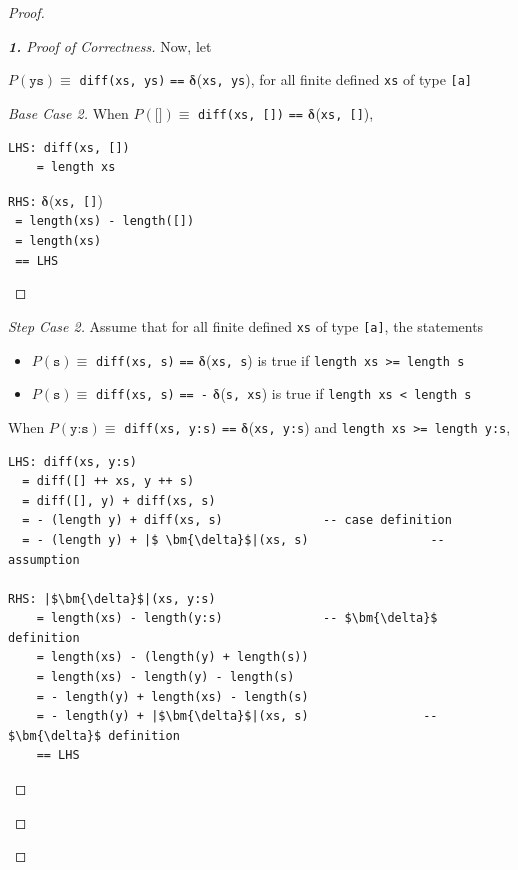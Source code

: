 \documentclass[12pt]{article}
\newcommand{\haskell}{\texttt}
\begin{document}
\begin{proof}
\begin{proof}[\textbf{1.} Proof of Correctness]
\bigskip\bigskip\par\noindent Now, let
\begin{center}
    $P(\haskell{ys}) \equiv$ \haskell{diff(xs, ys)} \haskell{==} $\bm{\delta}$(\haskell{xs, ys}), for all finite defined \haskell{xs} of type \haskell{[a]}
\end{center}

\begin{proof}[Base Case 2]
When $P(\haskell{[]}) \equiv$ \haskell{diff(xs, [])} \haskell{==} $\bm{\delta}$(\haskell{xs, []}),
\begin{mdframed}
\begin{multicols}{2}
\begin{verbatim}
LHS: diff(xs, [])
    = length xs
\end{verbatim}
\columnbreak
\haskell{RHS:} $ \bm{\delta}$(\haskell{xs, []}) \\
\haskell{    = length(xs) - length([])} \\
\haskell{    = length(xs)} \\
\haskell{    == LHS}
\end{multicols}
\end{mdframed}
\end{proof}

\begin{proof}[Step Case 2]
Assume that for all finite defined \haskell{xs} of type \haskell{[a]}, the statements
\begin{itemize}
    \item $P(\haskell{s}) \equiv$ \haskell{diff(xs, s)} \haskell{==} $\bm{\delta}$(\haskell{xs, s}) is true if \haskell{length xs >= length s}
    \item $P(\haskell{s}) \equiv$ \haskell{diff(xs, s)} \haskell{== -} $\bm{\delta}$(\haskell{s, xs}) is true if \haskell{length xs < length s}
\end{itemize}
 When $P(\haskell{y:s}) \equiv$ \haskell{diff(xs, y:s)} \haskell{==} $\bm{\delta}$(\haskell{xs, y:s}) and \haskell{length xs >= length y:s},
\begin{mdframed}
\begin{verbatim}
LHS: diff(xs, y:s)
  = diff([] ++ xs, y ++ s)
  = diff([], y) + diff(xs, s)
  = - (length y) + diff(xs, s)              -- case definition
  = - (length y) + |$ \bm{\delta}$|(xs, s)                 -- assumption

RHS: |$\bm{\delta}$|(xs, y:s)
    = length(xs) - length(y:s)              -- $\bm{\delta}$ definition
    = length(xs) - (length(y) + length(s))
    = length(xs) - length(y) - length(s)
    = - length(y) + length(xs) - length(s)
    = - length(y) + |$\bm{\delta}$|(xs, s)                -- $\bm{\delta}$ definition
    == LHS
\end{verbatim}
\end{mdframed}


\end{proof}
\end{proof}
\end{proof}
\end{document}
